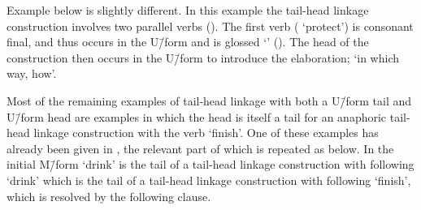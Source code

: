 Example  below is slightly different.
In this example the tail-head linkage construction involves
two parallel verbs ().
The first verb ( `protect') is consonant final,
and thus occurs in the U\=/form and is glossed `{\Uc}' ().
The head of the construction then occurs in the U\=/form
to introduce the elaboration;  `in which way, how'.

\newpage
\begin{exe}
	\label{ex:130928-1, 0.43-0.55}
	\begin{xlist}
	\end{xlist}
\end{exe}

Most of the remaining examples of tail-head linkage
with both a U\=/form tail and U\=/form head are examples
in which the head is itself a tail for an anaphoric tail-head linkage
construction with the verb  `finish'.
One of these examples has already been given in ,
the relevant part of which is repeated as  below.
In  the initial M\=/form  `drink'
is the tail of a tail-head linkage construction with following \mbox{} `drink'
which is the tail of a tail-head linkage construction with following  `finish',
which is resolved by the following clause. %


